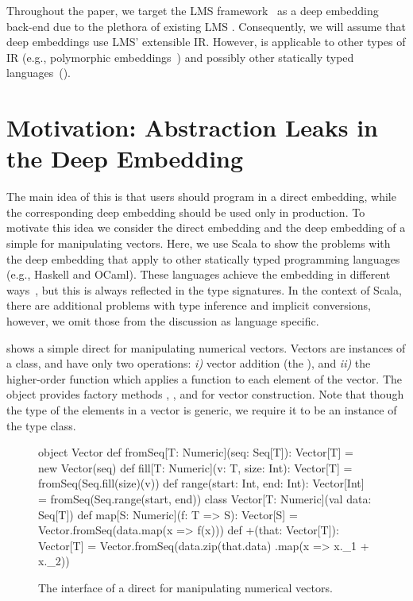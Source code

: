 Throughout the paper, we target the LMS
framework~\cite{rompf_lightweight_2012} as a deep embedding back-end due to the plethora of existing
LMS \edsls.  Consequently, we will assume that deep embeddings use
LMS' extensible IR.  However, \yy is applicable to other types of IR
(e.g., polymorphic embeddings~\cite{hofer_polymorphic_2008}) and
possibly other statically typed languages~().

\chapter{Motivation: Abstraction Leaks in the Deep Embedding}
\label{sec:motivation}

The main idea of this \work is that \edsl{} users should program in a
direct embedding, while the corresponding deep embedding should be used only in production.
To motivate this idea we consider the direct embedding and the deep embedding of a simple \edsl for manipulating vectors. Here, we use Scala to show the problems with the deep embedding that apply to other statically typed programming languages (e.g., Haskell and OCaml). These languages achieve the embedding in different ways~\cite{svenningsson_combining_2012,awesome,carette_finally_2009,guerrero_implementing_2004}, but this is always reflected in the type signatures. In the context of Scala, there are additional problems with type inference and implicit conversions, however, we omit those from the discussion as language specific.

 shows a simple direct \edsl{} for manipulating numerical vectors.
Vectors are instances of a  class, and have only two operations:
\emph{i)} vector addition (the \code{+}), and \emph{ii)} the higher-order  function which applies a function  to each element of the vector. The  object provides factory methods , , and  for vector construction. Note that though the type of the elements in a vector is generic, we require it to be an instance of the  type class.

\begin{figure}
\begin{listingtiny}
object Vector {
  def fromSeq[T: Numeric](seq: Seq[T]): Vector[T] =
    new Vector(seq)
  def fill[T: Numeric](v: T, size: Int): Vector[T] =
    fromSeq(Seq.fill(size)(v))
  def range(start: Int, end: Int): Vector[Int] =
    fromSeq(Seq.range(start, end))
}
class Vector[T: Numeric](val data: Seq[T]) {
  def map[S: Numeric](f: T => S): Vector[S] =
    Vector.fromSeq(data.map(x => f(x)))
  def +(that: Vector[T]): Vector[T] =
    Vector.fromSeq(data.zip(that.data)
      .map(x => x._1 + x._2))
}

\end{listingtiny}
\caption{\label{lst:vector} The interface of a direct \edsl for manipulating numerical vectors.}
\end{figure}

